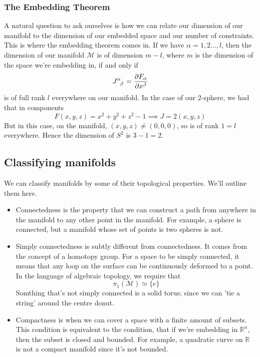 \documentclass[11pt, oneside]{article}   	%
\theoremstyle{slanted}
\begin{document}
\subsubsection{The Embedding Theorem} 
A natural question to ask ourselves is how we can relate our dimension of our manifold to the dimension of our embedded space and our number of constraints. This is where the embedding theorem comes in. If we have $\alpha = 1, 2 \dots, l$, then the dimension of our manifold $\mathcal{M}$ is of dimension $m  - l$, where $m$ is the dimension of the space we're embedding in, if and only if 
\[ 
	J\indices{^\alpha_\beta} = \frac{ \partial F_\alpha}{ \partial x^ \beta} \] 
is of full rank $l$ everywhere on our manifold.
In the case of our 2-sphere, we had that in components 
\[ 
	F(x, y, z) = x^2 + y^2 + z^2 - 1 \implies J = 2( x, y , z) 
\] 
But in this case, on the manifold, $(x, y, z) \neq ( 0 , 0 , 0)$, so is of rank $1 = l$ everywhere. Hence the dimension of $S^2$ is $3 - 1 = 2$. 
 
\subsection{Classifying manifolds} 
We can classify manifolds by some of their topological properties. We'll outline them here. 

\begin{itemize} 
	\item Connectedness is the property that we can construct a path from anywhere in the manifold to any other point in the manifold. For example, a sphere is connected, but a manifold whose set of points is two spheres is not. 
	\item Simply connectedness is subtly different from connectedness. It comes from the concept of a homotopy group. For a space to be simply connected, it means that any loop on the surface can be continuously deformed to a point. In the language of algebraic topology, we require that 
\[ 	
	\pi_1 ( \mathcal{M} ) \simeq \{ e \} 
\] 
Somthing that's not simply connected is a solid torus; since we can 'tie a string' around the centre donut. 
 	\item Compactness is when we can cover a space with a finite amount of subsets. This condition is equivalent to the condition, that if we're embedding in $\mathbb{R}^n$, then the subset is closed and bounded. 
For example, a quadratic curve on $\mathbb{R}$ is not a compact manifold since it's not bounded. 
\end{itemize}
 
\end{document}
